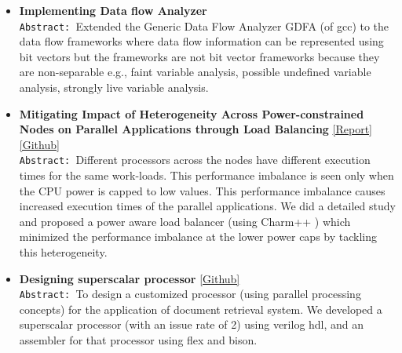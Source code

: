 \documentclass[9pt]{article}
\newenvironment{changemargin}[2]{%
  \begin{list}{}{%
    \setlength{\topsep}{0pt}%
    \setlength{\leftmargin}{#1}%
    \setlength{\rightmargin}{#2}%
    \setlength{\listparindent}{\parindent}%
    \setlength{\itemindent}{\parindent}%
    \setlength{\parsep}{\parskip}%
  }%
  \item[]}{\end{list}
}
\newenvironment{body} {
	\vspace*{-16pt}
	\begin{changemargin}{-0.25in}{-0.5in}
  }	
	{\end{changemargin}
}
\begin{document}
\begin{body}
\begin{itemize}
            \item \textbf{Implementing Data flow Analyzer} \\
                                \texttt{Abstract: }Extended the Generic Data Flow Analyzer
                                GDFA (of gcc) to the data flow frameworks where
                                data flow information can be represented using
                                bit vectors but the frameworks are not bit
                                vector frameworks because they are
                                non-separable e.g., faint variable analysis,
                                possible undefined variable analysis, strongly
                                live variable analysis.	
          \item \textbf{Mitigating Impact of Heterogeneity Across Power-constrained Nodes on Parallel Applications through Load Balancing}     
                                \href{http://web.engr.illinois.edu/~sdasgup3/Document/report_cs533.pdf}{[Report]} 
                                \href{https://github.com/sdasgup3/HeterogeneityAwareLoadBalancing}{[Github]} \\
                                  \texttt{Abstract: }Different processors across the nodes
                                  have different execution times for the same
                                  work-loads. This performance imbalance is seen
                                  only when the CPU power is capped to low
                                  values. This performance imbalance causes
                                  increased execution times of the parallel
                                  applications. We did a detailed study and
                                  proposed a power aware load balancer (using
                                      Charm++ ) which minimized the performance
                                  imbalance at the lower power caps by tackling
                                  this heterogeneity.  
           \item \textbf{Designing superscalar processor} \href{https://github.com/sdasgup3/Parallel-Processor-Design}{[Github]} \\
                                \texttt{Abstract: }To design a customized processor (using
                                    parallel processing concepts) for the
                                application of document retrieval system. We
                                developed a superscalar processor (with  an
                                    issue rate of 2) using verilog hdl, and an
                                assembler for that processor using flex and
                                bison.  


\end{itemize}
\end{body}
\end{document}
